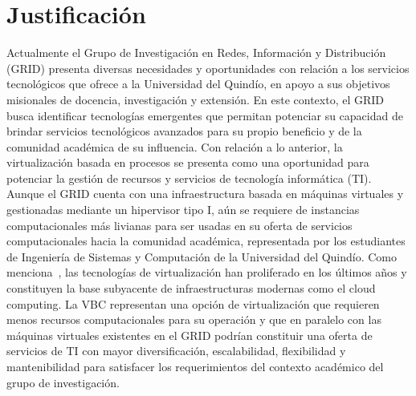 \chapter*{Justificación}
\label{cap:justificacion}
Actualmente el Grupo de Investigación en Redes, Información y Distribución 
(GRID) presenta diversas necesidades y oportunidades con relación a los servicios 
tecnológicos que ofrece a la Universidad del Quindío, en apoyo a sus objetivos 
misionales de docencia, investigación y extensión. En este contexto, el GRID 
busca identificar tecnologías emergentes que permitan potenciar su capacidad de 
brindar servicios tecnológicos avanzados para su propio beneficio y de la comunidad 
académica de su influencia. Con relación a lo anterior, la virtualización basada en
procesos se presenta como una oportunidad para potenciar la gestión de recursos y 
servicios de tecnología informática (TI). Aunque el GRID cuenta con una infraestructura 
basada en máquinas virtuales y gestionadas mediante un hipervisor tipo I, aún se requiere 
de instancias computacionales más livianas para ser usadas en su oferta de servicios computacionales 
hacia la comunidad académica, representada por los estudiantes de Ingeniería de Sistemas y Computación 
de la Universidad del Quindío.
Como menciona~\cite{Sepulveda-Rodriguez2022}, 
las tecnologías de virtualización han proliferado en los últimos años y constituyen 
la base subyacente de infraestructuras modernas como el cloud computing. La VBC representan una 
opción de virtualización que requieren menos recursos computacionales para su operación \citep{Xavier2013}
y que en paralelo con las máquinas virtuales existentes en el GRID podrían constituir una oferta de servicios 
de TI con mayor diversificación, escalabilidad, flexibilidad y mantenibilidad para satisfacer los requerimientos 
del contexto académico del grupo de investigación. 